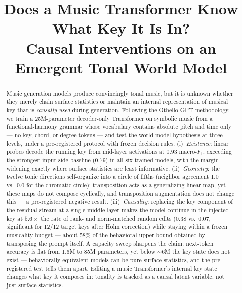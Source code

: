 \documentclass[conference]{IEEEtran}
\begin{document}
\title{Does a Music Transformer Know What Key It Is In?\\
Causal Interventions on an Emergent Tonal World Model}

\author{
}

\maketitle

\begin{abstract}
Music generation models produce convincingly tonal music, but it is unknown
whether they merely chain surface statistics or maintain an internal
representation of musical key that is \emph{causally used} during generation.
Following the Othello-GPT methodology, we train a 25M-parameter decoder-only
Transformer on symbolic music from a functional-harmony grammar whose
vocabulary contains absolute pitch and time only --- no key, chord, or degree
tokens --- and test the world-model hypothesis at three levels, under a
pre-registered protocol with frozen decision rules. (i)~\emph{Existence}:
linear probes decode the running key from mid-layer activations at
0.93 macro-$F_1$, exceeding the strongest input-side baseline (0.79) in all
six trained models, with the margin widening exactly where surface statistics
are least informative. (ii)~\emph{Geometry}: the twelve tonic directions
self-organize into a circle of fifths (neighbor agreement 1.0 vs.\ 0.0 for the
chromatic circle); transposition acts as a generalizing linear map, yet these
maps do not compose cyclically, and transposition augmentation does not change
this --- a pre-registered negative result. (iii)~\emph{Causality}: replacing
the key component of the residual stream at a single middle layer makes the
model continue in the injected key at $5.6\times$ the rate of rank- and
norm-matched random edits (0.38 vs.\ 0.07, significant for 12/12 target keys
after Holm correction) while staying within a frozen musicality budget ---
about $58\%$ of the behavioral upper bound obtained by transposing the prompt
itself. A capacity sweep sharpens the claim: next-token accuracy is flat from
1.6M to 85M parameters, yet below ${\sim}6$M the key state does not exist ---
behaviorally equivalent models can be pure surface statistics, and the
pre-registered test tells them apart. Editing a music Transformer's internal
key state changes what key it composes in: tonality is tracked as a causal
latent variable, not just surface statistics.
\end{abstract}
\end{document}
